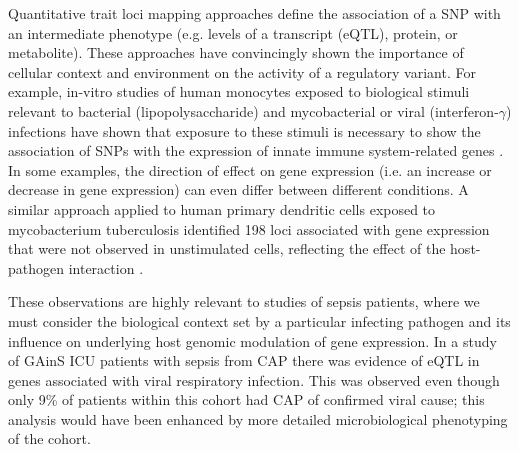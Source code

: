 Quantitative trait loci mapping approaches define the association of a SNP with an intermediate phenotype (e.g. levels of a transcript (eQTL), protein, or metabolite). These approaches have convincingly shown the importance of cellular context and environment on the activity of a regulatory variant. For example, in-vitro studies of human monocytes exposed to biological stimuli relevant to bacterial (lipopolysaccharide) and mycobacterial or viral (interferon-$\gamma$) infections have shown that exposure to these stimuli is necessary to show the association of SNPs with the expression of innate immune system-related genes \parencite{Fairfax2014}. In some examples, the direction of effect on gene expression (i.e. an increase or decrease in gene expression) can even differ between different conditions. A similar approach applied to human primary dendritic cells exposed to mycobacterium tuberculosis identified 198 loci associated with gene expression that were not observed in unstimulated cells, reflecting the effect of the host-pathogen interaction \parencite{Barreiro2012}. 

These observations are highly relevant to studies of sepsis patients, where we must consider the biological context set by a particular infecting pathogen and its influence on underlying host genomic modulation of gene expression. In a study of GAinS ICU patients with sepsis from CAP \parencite{Davenport2016} there was evidence of eQTL in genes associated with viral respiratory infection. This was observed even though only 9\% of patients within this cohort had CAP of confirmed viral cause; this analysis would have been enhanced by more detailed microbiological phenotyping of the cohort. 

